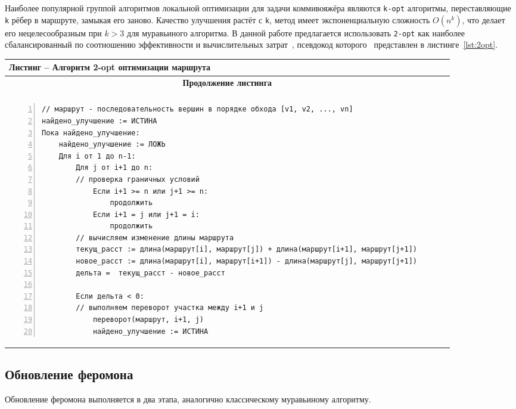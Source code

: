 Наиболее популярной группой алгоритмов локальной оптимизации для задачи коммивояжёра являются \texttt{k-opt} алгоритмы, переставляющие \texttt{k} рёбер в маршруте, замыкая его заново. Качество улучшения растёт с \texttt{k}, метод имеет экспоненциальную сложность $O(n^k)$, что делает его нецелесообразным при $k > 3$  для муравьиного алгоритма. В данной работе предлагается использовать \texttt{2-opt} как наиболее сбалансированный по соотношению эффективности и вычислительных затрат~\cite{2-opt},
псевдокод которого~\cite{2-opt-algo} представлен в листинге~\ref{lst:2opt}.

\begin{longtable}{|p{\linewidth}|}
	\multicolumn{1}{l}{\textbf{Листинг \themyListingCounter -- Алгоритм 2-opt оптимизации маршрута}} \\
	\hline
	\endfirsthead
	\hline
	\multicolumn{1}{|c|}{\textbf{Продолжение листинга \themyListingCounter}} \\
	\hline
	\endhead
	\hline
	\multicolumn{1}{|r|}{} \\[-4pt]
	\hline
	\endfoot
	\hline
	\endlastfoot
	\begin{minipage}{\linewidth}
		\begin{lstlisting}[numbers=left]
// маршрут - последовательность вершин в порядке обхода [v1, v2, ..., vn]
найдено_улучшение := ИСТИНА
Пока найдено_улучшение:
	найдено_улучшение := ЛОЖЬ
	Для i от 1 до n-1:
		Для j от i+1 до n:
		// проверка граничных условий
			Если i+1 >= n или j+1 >= n:
				продолжить
			Если i+1 = j или j+1 = i:
				продолжить
		// вычисляем изменение длины маршрута
		текущ_расст := длина(маршрут[i], маршрут[j]) + длина(маршрут[i+1], маршрут[j+1])
		новое_расст := длина(маршрут[i], маршрут[i+1]) - длина(маршрут[j], маршрут[j+1])
		дельта =  текущ_расст - новое_расст
		
		Если дельта < 0:
		// выполняем переворот участка между i+1 и j
			переворот(маршрут, i+1, j)
			найдено_улучшение := ИСТИНА
		\end{lstlisting}
	\end{minipage}
\end{longtable}
\label{lst:2opt}

\subsection{Обновление феромона}

Обновление феромона выполняется в два этапа, аналогично классическому муравьиному алгоритму.

